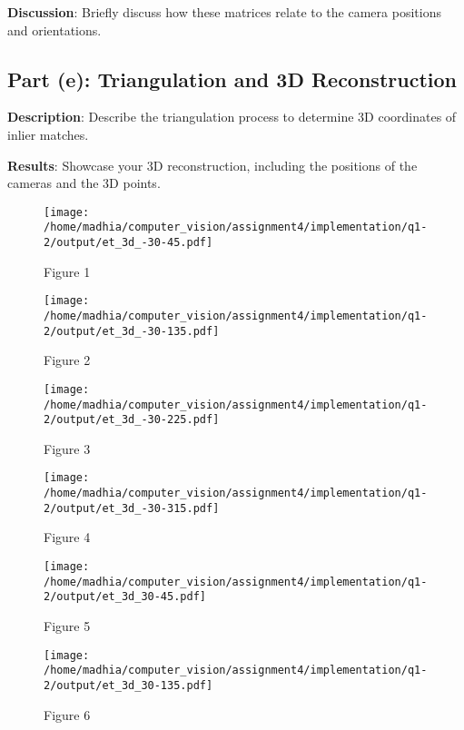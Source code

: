 \documentclass{article}
\begin{document}
\textbf{Discussion}: Briefly discuss how these matrices relate to the camera positions and orientations.

\subsection{Part (e): Triangulation and 3D Reconstruction}
\textbf{Description}: Describe the triangulation process to determine 3D coordinates of inlier matches.

\textbf{Results}: Showcase your 3D reconstruction, including the positions of the cameras and the 3D points.


\begin{figure}[h!]
    \centering
    \begin{minipage}{0.4\textwidth}
        \centering
        \texttt{[image: /home/madhia/computer\_vision/assignment4/implementation/q1-2/output/et\_3d\_-30-45.pdf]}
        \caption{Figure 1}
    \end{minipage}%
    \begin{minipage}{0.4\textwidth}
        \centering
        \texttt{[image: /home/madhia/computer\_vision/assignment4/implementation/q1-2/output/et\_3d\_-30-135.pdf]}
        \caption{Figure 2}
    \end{minipage}%
\end{figure}

\begin{figure}[h!]
    \centering
    \begin{minipage}{0.4\textwidth}
        \centering
        \texttt{[image: /home/madhia/computer\_vision/assignment4/implementation/q1-2/output/et\_3d\_-30-225.pdf]}
        \caption{Figure 3}
    \end{minipage}%
    \begin{minipage}{0.4\textwidth}
        \centering
        \texttt{[image: /home/madhia/computer\_vision/assignment4/implementation/q1-2/output/et\_3d\_-30-315.pdf]}
        \caption{Figure 4}
    \end{minipage}%
\end{figure}
    
\begin{figure}[h!]
    \centering    
    \begin{minipage}{0.4\textwidth}
        \centering
        \texttt{[image: /home/madhia/computer\_vision/assignment4/implementation/q1-2/output/et\_3d\_30-45.pdf]}
        \caption{Figure 5}
    \end{minipage}%
    \begin{minipage}{0.4\textwidth}
        \centering
        \texttt{[image: /home/madhia/computer\_vision/assignment4/implementation/q1-2/output/et\_3d\_30-135.pdf]}
        \caption{Figure 6}
    \end{minipage}%
\end{figure}
    
\end{document}
